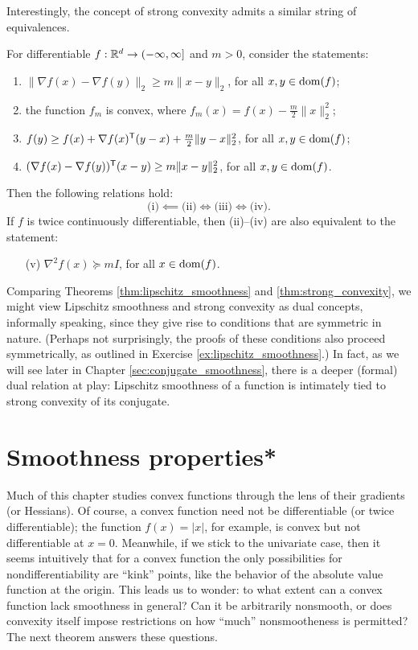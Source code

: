 Interestingly, the concept of strong convexity admits a similar string of
equivalences. 

\begin{Theorem}
\label{thm:strong_convexity}
For differentiable $f : \mathbb{R}^d \to (-\infty, \infty]$ and $m>0$, consider the
statements:  
\begin{enumerate}[label=(\roman*)]
\item $\|\nabla f(x) - \nabla f(y)\|_2 \geq m \|x-y\|_2$, for all $x,y \in
  \operatorname{dom}(f)$; 
\item the function $f_m$ is convex, where $f_m(x) = f(x) - \frac{m}{2}
  \|x\|_2^2$;   
\item $f(y) \geq f(x) + \nabla f(x)^{\mathsf{T}} (y-x) + \frac{m}{2} \|y-x\|_2^2$, for all
  $x,y \in \operatorname{dom}(f)$;
\item $(\nabla f(x) - \nabla f(y))^{\mathsf{T}} (x - y) \geq m\|x-y\|_2^2$, for all $x,y
  \in \operatorname{dom}(f)$.
\end{enumerate}
Then the following relations hold: 
\[
\text{(i)} \impliedby \text{(ii)} \iff \text{(iii)} \iff \text{(iv)}. 
\]
If $f$ is twice continuously differentiable, then (ii)--(iv) are also equivalent
to the statement: 
\begin{enumerate}
\item[(v)] $\nabla^2 f(x) \succeq mI$, for all $x \in \operatorname{dom}(f)$.
\end{enumerate}
\end{Theorem}

Comparing Theorems \ref{thm:lipschitz_smoothness} and
\ref{thm:strong_convexity}, we might view Lipschitz smoothness and strong
convexity as dual concepts, informally speaking, since they give rise to
conditions that are symmetric in nature. (Perhaps not surprisingly, the proofs
of these conditions also proceed symmetrically, as outlined in Exercise
\ref{ex:lipschitz_smoothness}.)  In fact, as we will see later in Chapter 
\ref{sec:conjugate_smoothness}, there is a deeper (formal) dual relation at
play: Lipschitz smoothness of a function is intimately tied to strong convexity
of its conjugate.

\section{Smoothness properties*}

Much of this chapter studies convex functions through the lens of their
gradients (or Hessians). Of course, a convex function need not be differentiable
(or twice differentiable); the function $f(x) = |x|$, for example, is convex but
not differentiable at $x=0$. Meanwhile, if we stick to the univariate case,
then it seems intuitively that for a convex function the only possibilities for 
nondifferentiability are ``kink'' points, like the behavior of the absolute
value function at the origin. This leads us to wonder: to what extent can a
convex function lack smoothness in general? Can it be arbitrarily nonsmooth, or 
does convexity itself impose restrictions on how ``much'' nonsmootheness is
permitted? The next theorem answers these questions.

